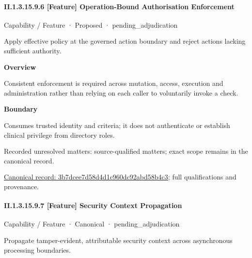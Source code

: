 \paragraph*{II.1.3.15.9.6 [Feature] Operation-Bound Authorisation Enforcement}
\label{navigation:II.1.3.15.9.6}

\label{element:3b7dcee7d58d4d1c960dc92abd58b4c3}
{\small Capability / Feature · Proposed · pending\_adjudication}\par

Apply effective policy at the governed action boundary and reject actions lacking sufficient authority.



\textbf{Overview}



Consistent enforcement is required across mutation, access, execution and administration rather than relying on each caller to voluntarily invoke a check.



\textbf{Boundary}



Consumes trusted identity and criteria; it does not authenticate or establish clinical privilege from directory roles.


{\small Recorded unresolved matters: source-qualified matters; exact scope remains in the canonical record.}\par
{\footnotesize \href{../../../../continuum/strategy/capability/feature/3b7dcee7d58d4d1c960dc92abd58b4c3.md}{Canonical record: 3b7dcee7d58d4d1c960dc92abd58b4c3}; full qualifications and provenance.}\par
\paragraph*{II.1.3.15.9.7 [Feature] Security Context Propagation}
\label{navigation:II.1.3.15.9.7}

\label{element:2b071c4fb10c4f61afecd18d09387214}
{\small Capability / Feature · Canonical · pending\_adjudication}\par

Propagate tamper-evident, attributable security context across asynchronous processing boundaries.



